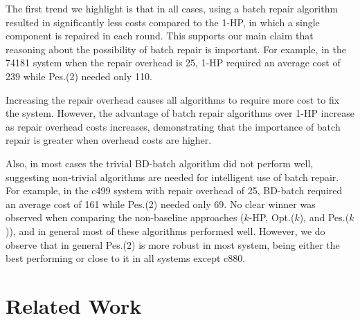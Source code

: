 \documentclass[letterpaper]{article}
\newcommand\meir[1]{\textcolor{red}{meir: #1}}
\newcommand{\planbased}{{\tt Plan-based-BRP}}
\begin{document}


The first trend we highlight is that in all cases, using a batch repair algorithm resulted in significantly less costs compared to the 1-HP, in which a single component is repaired in each round. This supports our main claim that reasoning about the possibility of batch repair is important. For example, in the 74181 system when the repair overhead is 25, 1-HP required an average cost of 239 while Pes.(2) needed only 110.  


Increasing the repair overhead causes all algorithms to require more cost to fix the system. However, the advantage of batch repair algorithms over 1-HP increase as repair overhead costs increases, demonstrating that the importance of batch repair is greater when overhead costs are higher. 

Also, in most cases the trivial BD-batch algorithm did not perform well, suggesting non-trivial algorithms are needed for intelligent use of batch repair. For example, in the c499 system with repair overhead of 25, BD-batch required an average cost of 161 while Pes.(2) needed only 69. No clear winner was observed when comparing the non-baseline approaches ($k$-HP, Opt.($k$), and Pes.($k$)), and in general most of these algorithms performed well. 
However, we do observe that in general Pes.($2$) is more robust in most system, being either the best performing or close to it in all systems except c880. 


\section{Related Work}
\label{sec:relatedWork}	
\end{document}
